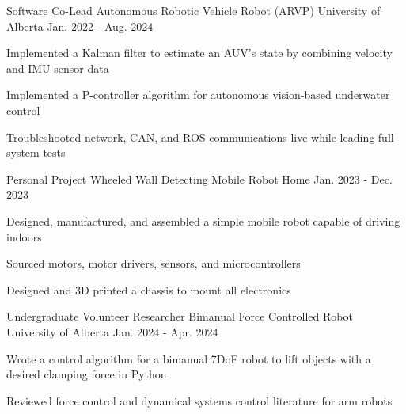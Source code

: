 \begin{cventries}
\cventry
    {Software Co-Lead} %
    {Autonomous Robotic Vehicle Robot (ARVP)} %
    {University of Alberta} %
    {Jan. 2022 - Aug. 2024} %
    {
    \begin{cvitems} %
      \item Implemented a Kalman filter to estimate an AUV's state by combining velocity and IMU sensor data 
      \item Implemented a P-controller algorithm for autonomous vision-based underwater control
      \item Troubleshooted network, CAN, and ROS communications live while leading full system tests 
    \end{cvitems}
    }
  \cventry
      {Personal Project} %
      {Wheeled Wall Detecting Mobile Robot} %
      {Home} %
      {Jan. 2023 - Dec. 2023} %
      {
      \begin{cvitems} %
        \item Designed, manufactured, and assembled a simple mobile robot capable of driving indoors 
        \item Sourced motors, motor drivers, sensors, and microcontrollers
        \item Designed and 3D printed a chassis to mount all electronics
      \end{cvitems}
      }
      \vspace{1.5mm}  %
  
\cventry
    {Undergraduate Volunteer Researcher} %
    {Bimanual Force Controlled Robot} %
    {University of Alberta} %
    {Jan. 2024 - Apr. 2024} %
    {
      \begin{cvitems} %
        \item Wrote a control algorithm for a bimanual 7DoF robot to lift objects with a desired clamping force in Python
        \item Reviewed force control and dynamical systems control literature for arm robots
      \end{cvitems}
    }
  

\end{cventries}
